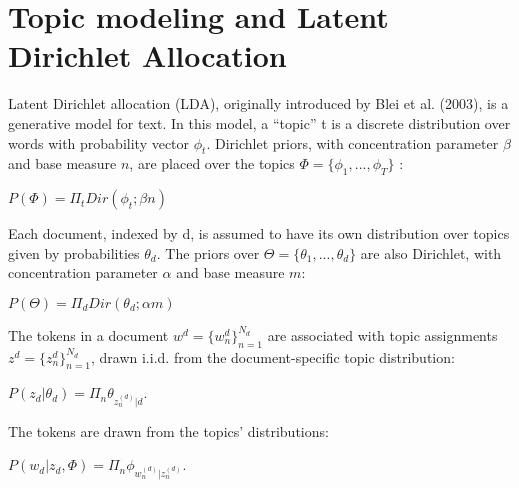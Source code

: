 \documentclass[10pt,a5paper,twoside]{article}
\begin{document}



\section{Topic modeling and Latent Dirichlet Allocation}

Latent Dirichlet allocation (LDA), originally introduced by Blei et al. (2003), is a generative model for text. In this model, a “topic” t is a discrete distribution over words with probability vector $\phi_{t}$. Dirichlet
priors, with concentration parameter $\beta$ and base measure $n$, are placed over the topics $\Phi = \lbrace \phi_{1}, ... , \phi_{T} \rbrace $ :

\begin{center}
$P\left( \Phi \right)  = \Pi_{t}  Dir\left(  \phi_{t} ; \beta n  \right) $
\end{center}


Each document, indexed by d, is assumed to have its own distribution over topics given by probabilities $\theta_{d}$. The priors over $\Theta = \lbrace  \theta_{1}, ... , \theta_{d}  \rbrace$ are also Dirichlet, with concentration parameter $\alpha$ and base measure $m$:

\begin{center}
$P\left( \Theta \right)  = \Pi_{d}  Dir\left(  \theta_{d} ; \alpha m  \right) $
\end{center}

The tokens in a document $w^{d} = \lbrace w^{d}_{n} \rbrace^{N_{d}}_{n=1} $ are associated with topic assignments $z^{d} = \lbrace z^{d}_{n} \rbrace^{N_{d}}_{n=1} $, drawn i.i.d. from the document-specific topic distribution:
\begin{center}
$P\left( z_{d} | \theta_{d}  \right) = \Pi_{n} \theta_{ z^{\left( d\right) }_{n} | d}$.
\end{center}
The tokens are drawn from the topics’ distributions:
\begin{center}
$P\left( w_{d} | z_{d}, \Phi  \right) = \Pi_{n} \phi_{ w^{\left( d\right) }_{n} | z^{\left( d\right) }_{n}}$.
\end{center}
\end{document}
